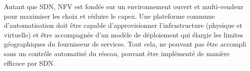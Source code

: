 Autant que SDN, NFV est fondée sur un environnement ouvert et multi-vendeur pour maximiser les choix et réduire le \gls{capex}. Une plateforme commune d'automatisation doit être capable d'approvisionner l'infrastructure (physique et virtuelle) et être accompagnée d'un modèle de déploiement qui élargie les limites géographiques du fournisseur de services. Tout cela, ne pouvant pas être accompli sans un contrôle automatisé du réseau, pouvant être implémenté de manière efficace par SDN. \cite{OFSDNNFVand} \cite{nfvUseCases}
